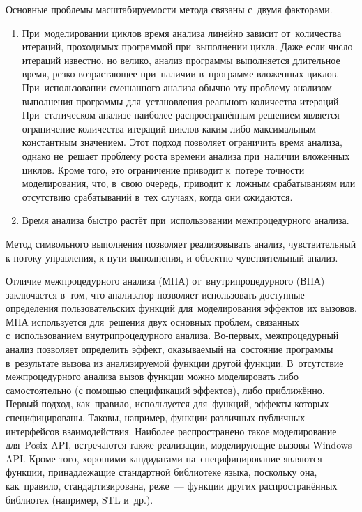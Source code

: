 Основные проблемы масштабируемости метода связаны с~двумя факторами.
\begin{enumerate}
 \item При~моделировании циклов время анализа линейно зависит от~количества итераций, проходимых программой при~выполнении цикла. Даже если число итераций известно, но велико, анализ программы выполняется длительное время, резко возрастающее при~наличии в~программе вложенных циклов. При~использовании смешанного анализа обычно эту проблему анализом выполнения программы для~установления реального количества итераций. При~статическом анализе наиболее распространённым решением является ограничение количества итераций циклов каким-либо максимальным константным значением. Этот подход позволяет ограничить время анализа, однако не~решает проблему роста времени анализа при~наличии вложенных циклов. Кроме того, это ограничение приводит к~потере точности моделирования, что, в~свою очередь, приводит к~ложным срабатываниям или отсутствию срабатываний в~тех случаях, когда они ожидаются.
 \item Время анализа быстро растёт при~использовании межпроцедурного анализа.
\end{enumerate}

Метод символьного выполнения позволяет реализовывать анализ, чувствительный к потоку управления, к пути выполнения, и объектно-чувствительный анализ.

Отличие межпроцедурного анализа (МПА) от~внутрипроцедурного (ВПА) заключается в~том, что анализатор позволяет использовать доступные определения пользовательских функций для~моделирования эффектов их вызовов. МПА используется для~решения двух основных проблем, связанных с~использованием внутрипроцедурного анализа. Во-первых, межпроцедурный анализ позволяет определить эффект, оказываемый на~состояние программы в~результате вызова из анализируемой функции другой функции. В~отсутствие межпроцедурного анализа вызов функции можно моделировать либо самостоятельно (с помощью спецификаций эффектов), либо приближённо. Первый подход, как~правило, используется для~функций, эффекты которых специфицированы. Таковы, например, функции различных публичных интерфейсов взаимодействия. Наиболее распространено такое моделирование для~Posix API, встречаются также реализации, моделирующие вызовы Windows API. Кроме того, хорошими кандидатами на~специфицирование являются функции, принадлежащие стандартной библиотеке языка, поскольку она, как~правило, стандартизирована, реже~--- функции других распространённых библиотек (например, STL и~др.).

